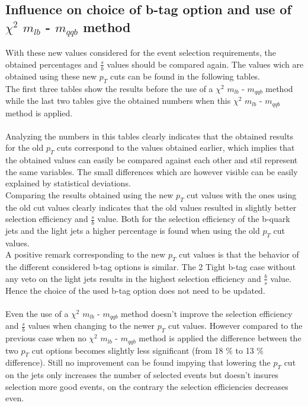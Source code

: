 \subsection{Influence on choice of b-tag option and use of $\chi^{2}$ $m_{lb}$ - $m_{qqb}$ method}
With these new values considered for the event selection requirements, the obtained percentages and $\frac{s}{b}$ values should be compared again.
The values wich are obtained using these new $p_T$ cuts can be found in the following tables.\\
The first three tables show the results before the use of a $\chi^{2}$ $m_{lb}$ - $m_{qqb}$ method while the last two tables give the obtained numbers when this $\chi^{2}$ $m_{lb}$ - $m_{qqb}$ method is applied.\\
\\
Analyzing the numbers in this tables clearly indicates that the obtained results for the old $p_T$ cuts correspond to the values obtained earlier, which implies that the obtained values can easily be compared against each other and stil represent the same variables. The small differences which are however visible can be easily explained by statistical deviations.\\
Comparing the results obtained using the new $p_T$ cut values with the ones using the old cut values clearly indicates that the old values resulted in slightly better selection efficiency and $\frac{s}{b}$ value. Both for the selection efficiency of the b-quark jets and the light jets a higher percentage is found when using the old $p_T$ cut values. \\
A positive remark corresponding to the new $p_T$ cut values is that the behavior of the different considered b-tag options is similar. The 2 Tight b-tag case without any veto on the light jets results in the highest selection efficiency and $\frac{b}{s}$ value. Hence the choice of the used b-tag option does not need to be updated.\\
\\
Even the use of a $\chi^{2}$ $m_{lb}$ - $m_{qqb}$ method doesn't improve the selection efficiency and $\frac{s}{b}$ values when changing to the newer $p_T$ cut values. However compared to the previous case when no $\chi^{2}$ $m_{lb}$ - $m_{qqb}$ method is applied the difference between the two $p_T$ cut options becomes slightly less significant (from 18 $\%$ to 13 $\%$ difference). Still no improvement can be found impying that lowering the $p_T$ cut on the jets only increases the number of selected events but doesn't insures selection more good events, on the contrary the selection efficiencies decreases even.
